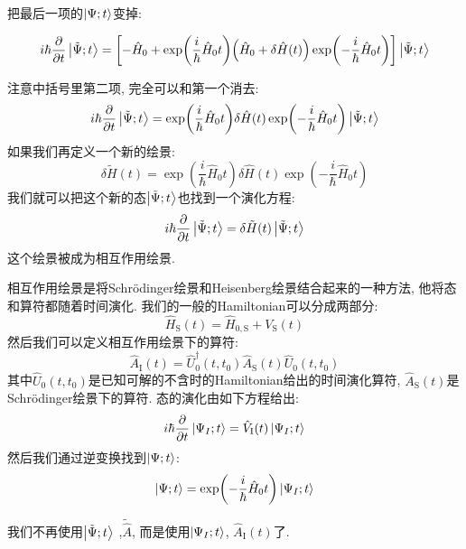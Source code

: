 把最后一项的$\ket{{\Psi};t}$变掉:
\begin{small}
\begin{equation}
	i\hbar \pdv{}{t} \ket{\tilde{\Psi};t} = \bqty{ -\hat{H}_0 + \exp(\frac{i}{\hbar} \hat{H}_0 t) \pqty{\hat{H}_0+\delta\hat{H}(t)} \exp(-\frac{i}{\hbar} \hat{H}_0 t) } \ket{\tilde{\Psi};t}
\end{equation}
\end{small}
注意中括号里第二项, 完全可以和第一个消去:
\begin{equation}
	i\hbar \pdv{}{t} \ket{\tilde{\Psi};t} = \exp(\frac{i}{\hbar} \hat{H}_0 t) \delta\hat{H}(t) \exp(-\frac{i}{\hbar} \hat{H}_0 t) \ket{\tilde{\Psi};t}
\end{equation}
如果我们再定义一个新的绘景:
\begin{equation}
	\delta{\tilde{H}}(t)=\exp(\frac{i}{\hbar} \hat{H}_0 t) \delta\hat{H}(t) \exp(-\frac{i}{\hbar} \hat{H}_0 t)
\end{equation}
我们就可以把这个新的态$\ket{\tilde{\Psi};t}$也找到一个演化方程:
\begin{equation}
	i\hbar \pdv{}{t} \ket{\tilde{\Psi};t} = \delta\tilde{H}(t)\ket{\tilde{\Psi};t}
\end{equation}
这个绘景被成为相互作用绘景.


\begin{definition}[][相互作用绘景]
  相互作用绘景是将Schrödinger绘景和Heisenberg绘景结合起来的一种方法, 他将态和算符都随着时间演化.
  我们的一般的Hamiltonian可以分成两部分:
  \begin{equation}
    \hat{H}_{\text{S}}(t) = \hat{H}_{0, \text{S}} + V_{\text{S}}(t)
  \end{equation}
  然后我们可以定义相互作用绘景下的算符:
  \begin{equation}
    \hat{A}_{\text{I}}(t) = \hat{U}_0^\dagger(t,t_0) \hat{A}_{\text{S}}(t) \hat{U}_0(t,t_0)
  \end{equation}
  其中$\hat{U}_0(t,t_0)$是已知可解的不含时的Hamiltonian给出的时间演化算符, $\hat{A}_{\text{S}}(t)$是Schrödinger绘景下的算符.
  态的演化由如下方程给出:
  \begin{equation}
    i\hbar \pdv{}{t} \ket{\Psi_I;t} = \hat{V}_{\text{I}}(t)\ket{\Psi_I;t}
  \end{equation}
  然后我们通过逆变换找到$\ket{\Psi;t}$:
  \begin{equation}
    \ket{\Psi;t} = \exp(-\frac{i}{\hbar} \hat{H}_0 t) \ket{\Psi_I;t}
  \end{equation}
\end{definition}
我们不再使用$\ket{\tilde{\Psi};t}$ ,$\tilde{\hat{A}}$, 而是使用$\ket{\Psi_I;t}$, $\hat{A}_{\text{I}}(t)$了.


